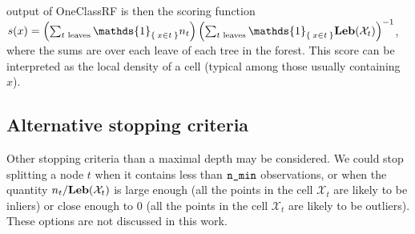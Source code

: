 output of \ac{OneClassRF} is then the scoring function
$s(x) = \left(\sum_{t \text{~leaves}} \mathds{1}_{\Set{x \in t}} n_t\right)
\left(\sum_{t \text{~leaves}} \mathds{1}_{\Set{x \in t}}
\Leb(\mathcal{X}_t)\right)^{-1}$, where the sums are over each leave of each
tree in the forest.  This score can be interpreted as the local density of a
 cell (typical among those usually containing $x$).
%
\subsection{Alternative stopping criteria}\label{supp:stopping_criteria} Other
stopping criteria than a maximal depth may be considered. We could stop
splitting a node $t$ when it contains less than $\texttt{n\textunderscore min}$
observations, or when the quantity $n_t/\mathbf{Leb}(\mathcal{X}_t)$ is large enough
(all the points in the cell $\mathcal{X}_t$ are likely to be inliers) or close
enough to $0$ (all the points in the cell $\mathcal{X}_t$ are likely to be
outliers). These options are not discussed in this work.


